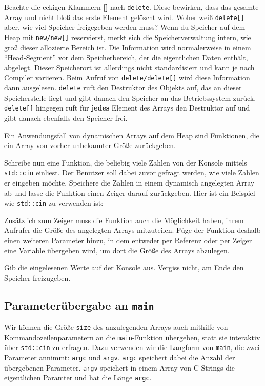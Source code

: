 Beachte die eckigen Klammern \textbf{[]} nach \lstinline{delete}.
Diese bewirken, dass das gesamte Array und nicht bloß das erste Element gelöscht wird.
Woher weiß \lstinline{delete[]} aber, wie viel Speicher freigegeben werden muss? 
Wenn du Speicher auf dem Heap mit \lstinline{new/new[]} reservierst, merkt sich die Speicherverwaltung intern, wie groß dieser allozierte Bereich ist. 
Die Information wird normalerweise in einem ``Head-Segment'' vor dem Speicherbereich, der die eigentlichen Daten enthält, abgelegt.
Dieser Speicherort ist allerdings nicht standardisiert und kann je nach Compiler variieren.
Beim Aufruf von \lstinline{delete/delete[]} wird diese Information dann ausgelesen. 
\lstinline{delete} ruft den Destruktor des Objekts auf, das an dieser Speicherstelle liegt und gibt danach den Speicher an das Betriebssystem zurück. \lstinline{delete[]} hingegen ruft für \textbf{jedes} Element des Arrays den Destruktor auf und gibt danach ebenfalls den Speicher frei.

Ein Anwendungsfall von dynamischen Arrays auf dem Heap sind Funktionen, die ein Array von vorher unbekannter Größe zurückgeben.

Schreibe nun eine Funktion, die beliebig viele Zahlen von der Konsole mittels \lstinline{std::cin} einliest.
Der Benutzer soll dabei zuvor gefragt werden, wie viele Zahlen er eingeben möchte.
Speichere die Zahlen in einem dynamisch angelegten Array ab und lasse die Funktion einen Zeiger darauf zurückgeben.
Hier ist ein Beispiel wie \lstinline{std::cin} zu verwenden ist:


Zusätzlich zum Zeiger muss die Funktion auch die Möglichkeit haben, ihrem Aufrufer die Größe des angelegten Arrays mitzuteilen.
Füge der Funktion deshalb einen weiteren Parameter hinzu, in dem entweder per Referenz oder per Zeiger eine Variable übergeben wird, um dort die Größe des Arrays abzulegen.

Gib die eingelesenen Werte auf der Konsole aus.
Vergiss nicht, am Ende den Speicher freizugeben.

\subsection{Parameterübergabe an \lstinline{main}}
Wir können die Größe \lstinline{size} des anzulegenden Arrays auch mithilfe von Kommandozeilenparametern an die \lstinline{main}-Funktion übergeben, statt sie interaktiv über \lstinline{std::cin} zu erfragen.
Dazu verwenden wir die Langform von \lstinline{main}, die zwei Parameter annimmt: \lstinline{argc} und \lstinline{argv}.
\lstinline{argc} speichert dabei die Anzahl der übergebenen Parameter. 
\lstinline{argv} speichert in einem Array von C-Strings die eigentlichen Paramter und hat die Länge \lstinline{argc}.

